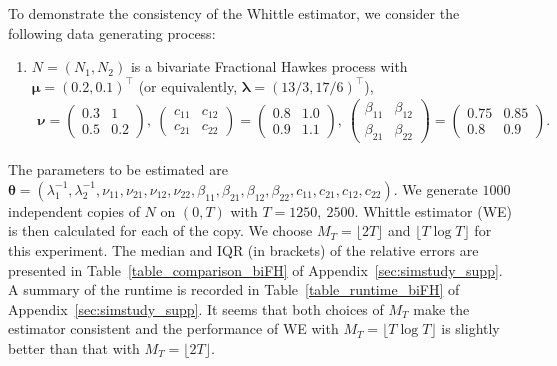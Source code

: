 \documentclass[11pt]{article}
\numberwithin{equation}{section}
\theoremstyle{plain}
\theoremstyle{definition}
\theoremstyle{definition}
\theoremstyle{assumption}
\theoremstyle{proposition}
\theoremstyle{proposition}
\theoremstyle{example}
\theoremstyle{lemma}
\theoremstyle{theorem}
\theoremstyle{remark}
\begin{document}
To demonstrate the consistency of the Whittle estimator, we consider the following data generating process:
\begin{enumerate}
 \item[FH5.] $N=(N_1,N_2)$ is a bivariate Fractional Hawkes process with $\boldsymbol{\mu} = (0.2, 0.1)^{\top}$ (or equivalently, $\boldsymbol{\lambda} = (13/3, 17/6)^{\top}$),
\begin{align*}
\boldsymbol{\nu} = 
\begin{pmatrix}
0.3 & 1 \\
0.5 & 0.2
\end{pmatrix} ,~
\begin{pmatrix}
c_{11} & c_{12} \\
c_{21} & c_{22}
\end{pmatrix} = 
\begin{pmatrix}
0.8 & 1.0 \\
0.9 & 1.1
\end{pmatrix} ,~
\begin{pmatrix}
\beta_{11} & \beta_{12} \\
\beta_{21} & \beta_{22}
\end{pmatrix} = 
\begin{pmatrix}
0.75 & 0.85 \\
0.8 & 0.9
\end{pmatrix} .
\end{align*}
\end{enumerate}
The parameters to be estimated are $\boldsymbol{\theta} = (\lambda_1^{-1},\lambda_2^{-1},\nu_{11},\nu_{21},\nu_{12},\nu_{22},\beta_{11},\beta_{21},\beta_{12},\beta_{22},c_{11},c_{21},c_{12},c_{22})$.
We generate $1000$ independent copies of $N$ on $(0,T)$ with $T=1250,~2500$. Whittle estimator (WE) is then calculated for each of the copy. We choose $M_T = \lfloor 2T\rfloor$ and $\lfloor T\log T\rfloor$ for this experiment. The median and IQR (in brackets) of the relative errors are presented in Table~\ref{table_comparison_biFH} of Appendix~\ref{sec:simstudy_supp}. A summary of the runtime is recorded in Table~\ref{table_runtime_biFH} of Appendix~\ref{sec:simstudy_supp}. It seems that both choices of $M_T$ make the estimator consistent and the performance of WE with $M_T = \lfloor T\log T\rfloor$ is slightly better than that with $M_T = \lfloor 2T\rfloor$.
\end{document}
